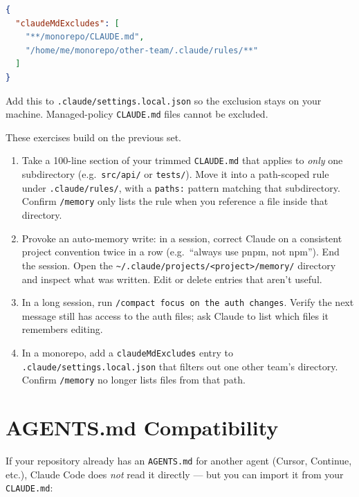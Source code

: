 \begin{lstlisting}[language=json,caption={Excluding ancestor CLAUDE.md files}]
{
  "claudeMdExcludes": [
    "**/monorepo/CLAUDE.md",
    "/home/me/monorepo/other-team/.claude/rules/**"
  ]
}
\end{lstlisting}

Add this to \texttt{.claude/settings.local.json} so the exclusion stays
on your machine. Managed-policy \texttt{CLAUDE.md} files cannot be excluded.

\begin{exercisebox}
These exercises build on the previous set.

\begin{enumerate}
  \item Take a 100-line section of your trimmed \texttt{CLAUDE.md} that
        applies to \emph{only} one subdirectory (e.g.\ \texttt{src/api/}
        or \texttt{tests/}). Move it into a path-scoped rule under
        \texttt{.claude/rules/}, with a \texttt{paths:} pattern matching
        that subdirectory. Confirm \texttt{/memory} only lists the rule
        when you reference a file inside that directory.
  \item Provoke an auto-memory write: in a session, correct Claude on a
        consistent project convention twice in a row (e.g.\
        ``always use pnpm, not npm''). End the session. Open the
        \texttt{\textasciitilde/.claude/projects/<project>/memory/}
        directory and inspect what was written. Edit or delete entries
        that aren't useful.
  \item In a long session, run \texttt{/compact focus on the auth
        changes}. Verify the next message still has access to the auth
        files; ask Claude to list which files it remembers editing.
  \item In a monorepo, add a \texttt{claudeMdExcludes} entry to
        \texttt{.claude/settings.local.json} that filters out one other
        team's directory. Confirm \texttt{/memory} no longer lists files
        from that path.
\end{enumerate}
\end{exercisebox}

\section{AGENTS.md Compatibility}
\label{sec:agents-md}

If your repository already has an \texttt{AGENTS.md} for another agent
(Cursor, Continue, etc.), Claude Code does \emph{not} read it directly — but
you can import it from your \texttt{CLAUDE.md}:

